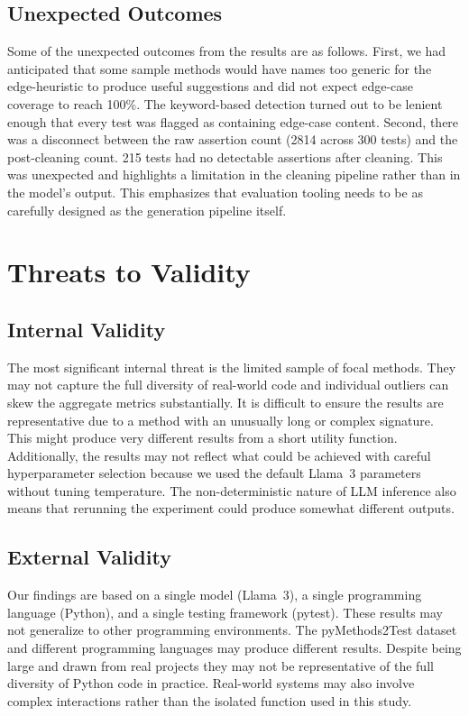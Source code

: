 \documentclass[conference]{IEEEtran}
\begin{document}
\subsection{Unexpected Outcomes}

Some of the unexpected outcomes from the results are as follows. First, we had anticipated that some sample methods would have names too generic for the edge-heuristic to produce useful suggestions and did not expect edge-case coverage to reach 100\%. The keyword-based detection turned out to be lenient enough that every test was flagged as containing edge-case content. Second, there was a disconnect between the raw assertion count (2814 across 300 tests) and the post-cleaning count. 215 tests had no detectable assertions after cleaning. This was unexpected and highlights a limitation in the cleaning pipeline rather than in the model's output. This emphasizes that evaluation tooling needs to be as carefully designed as the generation pipeline itself.

\section{Threats to Validity}

\subsection{Internal Validity}

The most significant internal threat is the limited sample of focal methods. They may not capture the full diversity of real-world code and individual outliers can skew the aggregate metrics substantially. It is difficult to ensure the results are representative due to a method with an unusually long or complex signature. This might produce very different results from a short utility function. Additionally, the results may not reflect what could be achieved with careful hyperparameter selection because we used the default Llama~3 parameters without tuning temperature. The non-deterministic nature of LLM inference also means that rerunning the experiment could produce somewhat different outputs.

\subsection{External Validity}

Our findings are based on a single model (Llama~3), a single programming language (Python), and a single testing framework (pytest). These results may not generalize to other programming environments. The pyMethods2Test dataset and different programming languages may produce different results. Despite being large and drawn from real projects they may not be representative of the full diversity of Python code in practice. Real-world systems may also involve complex interactions rather than the isolated function used in this study. 
\end{document}
